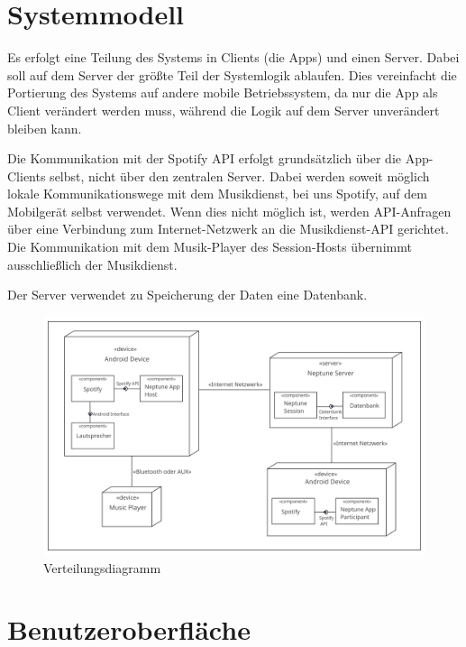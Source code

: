 \documentclass[oneside, ngerman]{sdqtechreport}
\begin{document}
\chapter{Systemmodell}
\label{chap:Systemmodell}

Es erfolgt eine Teilung des Systems in Clients (die Apps) und einen Server. Dabei soll auf dem Server der größte Teil der Systemlogik ablaufen. Dies vereinfacht die Portierung des Systems auf andere mobile Betriebssystem, da nur die App als Client verändert werden muss, während die Logik auf dem Server unverändert bleiben kann.

Die Kommunikation mit der Spotify API erfolgt grundsätzlich über die App-Clients selbst, nicht über den zentralen Server. Dabei werden soweit möglich lokale Kommunikationswege mit dem Musikdienst, bei uns Spotify, auf dem Mobilgerät selbst verwendet. Wenn dies nicht möglich ist, werden API-Anfragen über eine Verbindung zum Internet-Netzwerk an die Musikdienst-API gerichtet. Die Kommunikation mit dem Musik-Player des Session-Hosts übernimmt ausschließlich der Musikdienst.

Der Server verwendet zu Speicherung der Daten eine Datenbank.

\vspace{1cm}

\begin{figure}[h]
    \includegraphics[width = 16cm]{LATEX/Pflichtenheft/GraphicDesigns/Verteilungsdiagramm.png}
    \caption{Verteilungsdiagramm}
    \label{fig:Verteilungsdiagramm}
\end{figure}


\chapter{Benutzeroberfläche}
\label{chap:Benutzeroberfläche}
\end{document}
